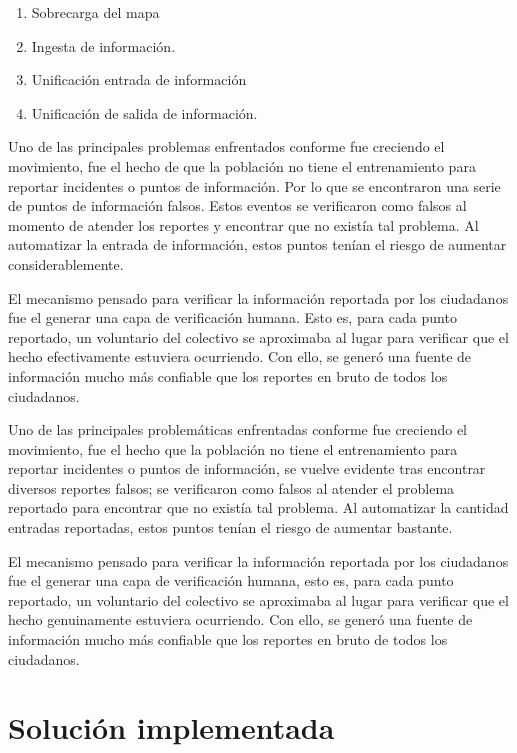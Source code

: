 \documentclass[12pt,spanish,oneside,breaklinks]{book}
\begin{document}
\begin{enumerate}
\item Sobrecarga del mapa
\item Ingesta de información.
\item Unificación entrada de información
\item Unificación de salida de información.
\end{enumerate}

Uno de las principales problemas enfrentados conforme fue creciendo el movimiento, fue el hecho de que la población no tiene el entrenamiento para reportar incidentes o puntos de información. Por lo que se encontraron una serie de puntos de información falsos. Estos eventos se verificaron como falsos al momento de atender los  reportes y encontrar que no existía tal problema. Al automatizar la entrada de información, estos puntos tenían el riesgo de aumentar considerablemente.

El mecanismo pensado para verificar la información reportada por los ciudadanos fue el generar una capa de verificación humana. Esto es, para cada punto reportado, un voluntario del colectivo se aproximaba al lugar para verificar que el hecho efectivamente estuviera ocurriendo. Con ello, se generó una fuente de información mucho más confiable que los reportes en bruto de todos los ciudadanos.

Uno de las principales problemáticas enfrentadas conforme fue creciendo el movimiento, fue el hecho que la población no tiene el entrenamiento para reportar incidentes o puntos de información, se vuelve evidente tras encontrar diversos reportes falsos; se verificaron como falsos al atender el problema reportado para encontrar que no existía tal problema. Al automatizar la cantidad entradas reportadas, estos puntos tenían el riesgo de aumentar bastante.

El mecanismo pensado para verificar la información reportada por los ciudadanos fue el generar una capa de verificación humana, esto es, para cada punto reportado, un voluntario del colectivo se aproximaba al lugar para verificar que el hecho genuinamente estuviera ocurriendo. Con ello, se generó una fuente de información mucho más confiable que los reportes en bruto de todos los ciudadanos.

\newpage

\chapter{Solución implementada}
\label{sec:orgca60366}
\end{document}
